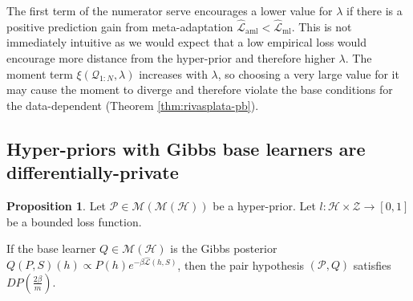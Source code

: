 \documentclass{article}
\theoremstyle{definition}
\newtheorem{proposition}[theorem]{Proposition}
\begin{document}
The first term of the numerator serve encourages a lower value for $\lambda$ if there is a positive prediction gain from meta-adaptation $\hat{\mathcal{L}}_{\mathrm{aml}}<\hat{\mathcal{L}}_{\mathrm{ml}}$. This is not immediately intuitive as we would expect that a low empirical loss would encourage more distance from the hyper-prior and therefore higher $\lambda$. The moment term $\xi(\mathcal{Q}_{1:N}, \lambda)$ increases with $\lambda$, so choosing a very large value for it may cause the moment to diverge and therefore violate the base conditions for the data-dependent (Theorem \ref{thm:rivasplata-pb}). 

%
%
%

\subsection{Hyper-priors with Gibbs base learners are differentially-private} \label{append:proof-dp}

\begin{proposition} \label{thm:pair-is-dp-appendix}
	Let $\mathcal{P}\in \mathcal{M}(\mathcal{M}(\mathcal{H}))$ be a hyper-prior.
	Let $l:\mathcal{H}\times \mathcal{Z}\rightarrow [0,1]$ be a bounded loss function.
	
	If the base learner $Q\in \mathcal{M}(\mathcal{H})$ is the Gibbs posterior $Q(P, S)(h)\propto P(h)e^{-\beta\hat{\mathcal{L}}(h, S)}$, 
	then the pair hypothesis $(\mathcal{P}, Q)$ satisfies $DP\left (\frac{2\beta}{m}\right )$.
\end{proposition}
\end{document}
